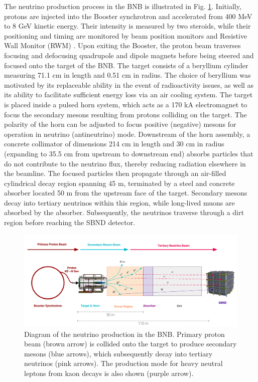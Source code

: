The neutrino production process in the BNB is illustrated in Fig. \ref{fig:BNBDiagram}.
Initially, protons are injected into the Booster synchrotron and accelerated from 400 MeV to 8 GeV kinetic energy. 
Their intensity is measured by two steroids, while their positioning and timing are monitored by beam position monitors and Resistive Wall Monitor (RWM) \cite{BNBRWM}.
Upon exiting the Booster, the proton beam traverses focusing and defocusing quadrupole and dipole magnets before being steered and focused onto the target of the BNB.
The target consists of a beryllium cylinder measuring 71.1 cm in length and 0.51 cm in radius.
The choice of beryllium was motivated by its replaceable ability in the event of radioactivity issues, as well as its ability to facilitate sufficient energy loss via an air cooling system.
The target is placed inside a pulsed horn system, which acts as a 170 kA electromagnet to focus the secondary mesons resulting from protons colliding on the target.
The polarity of the horn can be adjusted to focus positive (negative) mesons for operation in neutrino (antineutrino) mode. 
Downstream of the horn assembly, a concrete collimator of dimensions 214 cm in length and 30 cm in radius (expanding to 35.5 cm from upstream to downstream end) absorbs particles that do not contribute to the neutrino flux, thereby reducing radiation elsewhere in the beamline.
The focused particles then propagate through an air-filled cylindrical decay region spanning 45 m, terminated by a steel and concrete absorber located 50 m from the upstream face of the target.
Secondary mesons decay into tertiary neutrinos within this region, while long-lived muons are absorbed by the absorber. 
Subsequently, the neutrinos traverse through a dirt region before reaching the SBND detector.

\begin{figure}[tbp] 
\centering    
\includegraphics[width=1.0\textwidth]{BNBDiagram}
\caption[BNBDiagram]{
Diagram of the neutrino production in the BNB.
Primary proton beam (brown arrow) is collided onto the target to produce secondary mesons (blue arrows), which subsequently decay into tertiary neutrinos (pink arrows).
The production mode for heavy neutral leptons from kaon decays is also shown (purple arrow).
}
\label{fig:BNBDiagram}
\end{figure}


